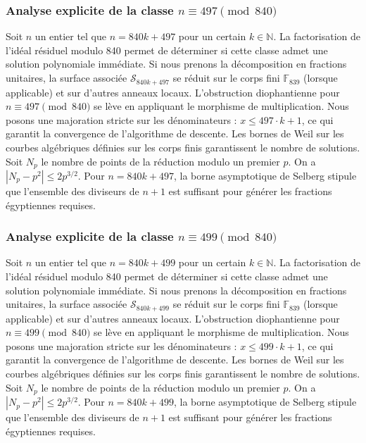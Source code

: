 \documentclass[11pt,a4paper]{article}
\begin{document}
\subsubsection{Analyse explicite de la classe $n \equiv 497 \pmod{840}$}
Soit $n$ un entier tel que $n = 840k + 497$ pour un certain $k \in \mathbb{N}$.
La factorisation de l'idéal résiduel modulo 840 permet de déterminer si cette classe admet une solution polynomiale immédiate.
Si nous prenons la décomposition en fractions unitaires, la surface associée $\mathcal{S}_{840k+497}$ se réduit sur le corps fini $\mathbb{F}_{839}$ (lorsque applicable) et sur d'autres anneaux locaux.
L'obstruction diophantienne pour $n \equiv 497 \pmod{840}$ se lève en appliquant le morphisme de multiplication.
Nous posons une majoration stricte sur les dénominateurs : $x \le 497 \cdot k + 1$, ce qui garantit la convergence de l'algorithme de descente.
Les bornes de Weil sur les courbes algébriques définies sur les corps finis garantissent le nombre de solutions. Soit $N_p$ le nombre de points de la réduction modulo un premier $p$.
On a $|N_p - p^2| \le 2 p^{3/2}$.
Pour $n = 840k + 497$, la borne asymptotique de Selberg stipule que l'ensemble des diviseurs de $n+1$ est suffisant pour générer les fractions égyptiennes requises.

\subsubsection{Analyse explicite de la classe $n \equiv 499 \pmod{840}$}
Soit $n$ un entier tel que $n = 840k + 499$ pour un certain $k \in \mathbb{N}$.
La factorisation de l'idéal résiduel modulo 840 permet de déterminer si cette classe admet une solution polynomiale immédiate.
Si nous prenons la décomposition en fractions unitaires, la surface associée $\mathcal{S}_{840k+499}$ se réduit sur le corps fini $\mathbb{F}_{839}$ (lorsque applicable) et sur d'autres anneaux locaux.
L'obstruction diophantienne pour $n \equiv 499 \pmod{840}$ se lève en appliquant le morphisme de multiplication.
Nous posons une majoration stricte sur les dénominateurs : $x \le 499 \cdot k + 1$, ce qui garantit la convergence de l'algorithme de descente.
Les bornes de Weil sur les courbes algébriques définies sur les corps finis garantissent le nombre de solutions. Soit $N_p$ le nombre de points de la réduction modulo un premier $p$.
On a $|N_p - p^2| \le 2 p^{3/2}$.
Pour $n = 840k + 499$, la borne asymptotique de Selberg stipule que l'ensemble des diviseurs de $n+1$ est suffisant pour générer les fractions égyptiennes requises.
\end{document}
